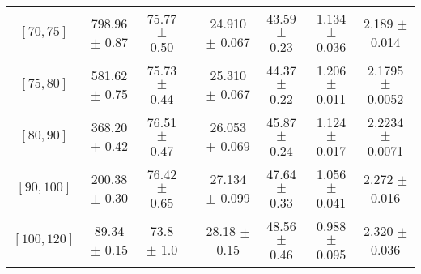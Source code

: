 \begin{tabular}{c||c|c|c|c|c|c|c}
$[70, 75]$ & 798.96 $\pm$ 0.87 & 75.77 $\pm$ 0.50 &  & 24.910 $\pm$ 0.067 & 43.59 $\pm$ 0.23 & 1.134 $\pm$ 0.036 & 2.189 $\pm$ 0.014\\
$[75, 80]$ & 581.62 $\pm$ 0.75 & 75.73 $\pm$ 0.44 &  & 25.310 $\pm$ 0.067 & 44.37 $\pm$ 0.22 & 1.206 $\pm$ 0.011 & 2.1795 $\pm$ 0.0052\\
$[80, 90]$ & 368.20 $\pm$ 0.42 & 76.51 $\pm$ 0.47 &  & 26.053 $\pm$ 0.069 & 45.87 $\pm$ 0.24 & 1.124 $\pm$ 0.017 & 2.2234 $\pm$ 0.0071\\
$[90, 100]$ & 200.38 $\pm$ 0.30 & 76.42 $\pm$ 0.65 &  & 27.134 $\pm$ 0.099 & 47.64 $\pm$ 0.33 & 1.056 $\pm$ 0.041 & 2.272 $\pm$ 0.016\\
$[100, 120]$ & 89.34 $\pm$ 0.15 & 73.8 $\pm$ 1.0 &  & 28.18 $\pm$ 0.15 & 48.56 $\pm$ 0.46 & 0.988 $\pm$ 0.095 & 2.320 $\pm$ 0.036\\
\end{tabular}
